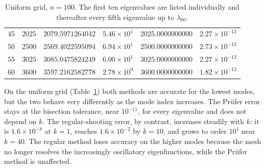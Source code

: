 \documentclass[12pt,reqno]{amsart}
\numberwithin{equation}{section}
\begin{document}
\begin{table}[ht]
\begin{tabular}{rrrrrr}
$45$ & $2025$ & $2079.5971264042$ & $5.46\times 10^{1}$  & $2025.0000000000$ & $2.27\times 10^{-12}$ \\
$50$ & $2500$ & $2569.4022595094$ & $6.94\times 10^{1}$  & $2500.0000000000$ & $2.73\times 10^{-12}$ \\
$55$ & $3025$ & $3085.0475824249$ & $6.00\times 10^{1}$  & $3025.0000000000$ & $2.27\times 10^{-12}$ \\
$60$ & $3600$ & $3597.2162582778$ & $2.78\times 10^{0}$  & $3600.0000000000$ & $1.82\times 10^{-12}$ \\
\bottomrule
\end{tabular}
\caption{Uniform grid, $n = 100$. The first ten eigenvalues are listed individually and thereafter every fifth eigenvalue up to $\lambda_{60}$.}
\label{tab:uniform}
\end{table}

On the uniform grid (Table~\ref{tab:uniform}) both methods are accurate for the lowest modes, but the two behave very differently as the mode index increases. The Pr\"ufer error stays at the bisection tolerance, near $10^{-11}$, for every eigenvalue and does not depend on $k$. The regular-shooting error, by contrast, increases steadily with $k$: it is $1.6\times 10^{-8}$ at $k=1$, reaches $1.6\times 10^{-2}$ by $k=10$, and grows to order $10^{1}$ near $k=40$. The regular method loses accuracy on the higher modes because the mesh no longer resolves the increasingly oscillatory eigenfunctions, while the Pr\"ufer method is unaffected.
\end{document}
